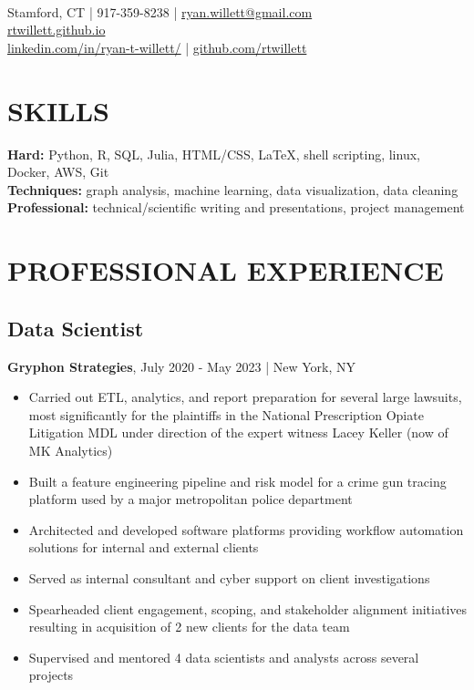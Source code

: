 \documentclass[11pt]{article}
\title{\vspace{-7cm}}
\date{}
\author{Ryan Willett}
\newenvironment{myitemize}
{ \begin{itemize}
	\setlength{\itemsep}{0pt}
	\setlength{\parskip}{0pt}
	\setlength{\parsep}{0pt}     }
{ \end{itemize}                  }
\begin{document}
\maketitle

\section*{}
  \\
\normalsize
Stamford, CT | 917-359-8238 | \href{mailto:ryan.willett@gmail.com}{ryan.willett@gmail.com} \\
\href{http://rtwillett.github.io}{rtwillett.github.io} \\
\href{https://linkedin.com/in/ryan-t-willett/}{linkedin.com/in/ryan-t-willett/} | \href{https://github.com/rtwillett}{github.com/rtwillett}

\raggedright

\section*{SKILLS}
{\bfseries Hard:} Python, R, SQL, Julia, HTML/CSS, \LaTeX, shell scripting, linux, Docker, AWS, Git \\
{\bfseries Techniques:} graph analysis, machine learning, data visualization, data cleaning \\
{\bfseries Professional:} technical/scientific writing and presentations, project management

\section*{PROFESSIONAL EXPERIENCE}
\subsection*{Data Scientist}
{\bfseries Gryphon Strategies}, July 2020 - May 2023 | New York, NY
\begin{myitemize}
	\item Carried out ETL, analytics, and report preparation for several large lawsuits, most significantly for the plaintiffs in the National Prescription Opiate Litigation MDL under direction of the expert witness Lacey Keller (now of MK Analytics)
	\item Built a feature engineering pipeline and risk model for a crime gun tracing platform used by a major metropolitan police department
	\item Architected and developed software platforms providing workflow automation solutions for internal and external clients
	\item Served as internal consultant and cyber support on client investigations
	\item Spearheaded client engagement, scoping, and stakeholder alignment initiatives resulting in acquisition of 2 new clients for the data team
	\item Supervised and mentored 4 data scientists and analysts across several projects
\end{myitemize}
\end{document}
